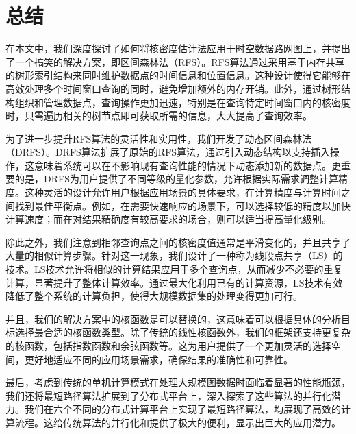 \chapter{总结}

	在本文中，我们深度探讨了如何将核密度估计法应用于时空数据路网图上，并提出了一个搞笑的解决方案，即区间森林法（RFS）。RFS算法通过采用基于内存共享的树形索引结构来同时维护数据点的时间信息和位置信息。这种设计使得它能够在高效处理多个时间窗口查询的同时，避免增加额外的内存开销。此外，通过树形结构组织和管理数据点，查询操作更加迅速，特别是在查询特定时间窗口内的核密度时，只需遍历相关的树节点即可获取所需的信息，大大提高了查询效率。

	为了进一步提升RFS算法的灵活性和实用性，我们开发了动态区间森林法（DRFS）。DRFS算法扩展了原始的RFS算法，通过引入动态结构以支持插入操作，这意味着系统可以在不影响现有查询性能的情况下动态添加新的数据点。更重要的是，DRFS为用户提供了不同等级的量化参数，允许根据实际需求调整计算精度。这种灵活的设计允许用户根据应用场景的具体要求，在计算精度与计算时间之间找到最佳平衡点。例如，在需要快速响应的场景下，可以选择较低的精度以加快计算速度；而在对结果精确度有较高要求的场合，则可以适当提高量化级别。

	除此之外，我们注意到相邻查询点之间的核密度值通常是平滑变化的，并且共享了大量的相似计算步骤。针对这一现象，我们设计了一种称为线段点共享（LS）的技术。LS技术允许将相似的计算结果应用于多个查询点，从而减少不必要的重复计算，显著提升了整体计算效率。通过最大化利用已有的计算资源，LS技术有效降低了整个系统的计算负担，使得大规模数据集的处理变得更加可行。

	并且，我们的解决方案中的核函数是可以替换的，这意味着可以根据具体的分析目标选择最合适的核函数类型。除了传统的线性核函数外，我们的框架还支持更复杂的核函数，包括指数函数和余弦函数等。这为用户提供了一个更加灵活的选择空间，更好地适应不同的应用场景需求，确保结果的准确性和可靠性。

	最后，考虑到传统的单机计算模式在处理大规模图数据时面临着显著的性能瓶颈，我们还将最短路径算法扩展到了分布式平台上，深入探索了这些算法的并行化潜力。我们在六个不同的分布式计算平台上实现了最短路径算法，均展现了高效的计算流程。这给传统算法的并行化和提供了极大的便利，显示出巨大的应用潜力。

	
